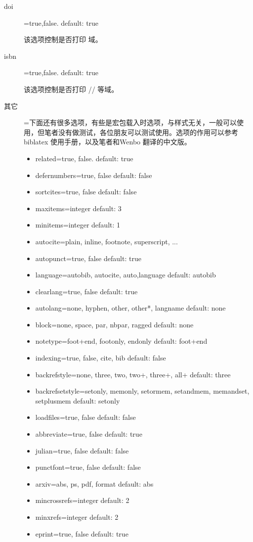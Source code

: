 \begin{description}
  \item[doi]=true,false. \hfill default: true

  该选项控制是否打印  域。

  \item[isbn]=true,false. \hfill default: true

  该选项控制是否打印 \slash {}\slash {} 等域。

  \item[其它]=下面还有很多选项，有些是宏包载入时选项，与样式无关，一般可以使用，但笔者没有做测试，各位朋友可以测试使用。选项的作用可以参考biblatex 使用手册，以及笔者和Wenbo 翻译的中文版。
      \begin{itemize}
          \item related=true, false. default: true
          \item defernumbers=true, false default: false
          \item sortcites=true, false default: false
          \item maxitems=integer default: 3
          \item minitems=integer default: 1
          \item autocite=plain, inline, footnote, superscript, ...
          \item autopunct=true, false default: true
          \item language=autobib, autocite, auto,language default: autobib
          \item clearlang=true, false default: true
          \item autolang=none, hyphen, other, other*, langname default: none
          \item block=none, space, par, nbpar, ragged default: none
          \item notetype=foot+end, footonly, endonly default: foot+end
          \item indexing=true, false, cite, bib default: false
          \item backrefstyle=none, three, two, two+, three+, all+ default: three
          \item backrefsetstyle=setonly, memonly, setormem, setandmem, memandset, setplusmem default: setonly
          \item loadfiles=true, false default: false
          \item abbreviate=true, false default: true
          \item julian=true, false default: false
          \item punctfont=true, false default: false
          \item arxiv=abs, ps, pdf, format default: abs
          \item mincrossrefs=integer default: 2
          \item minxrefs=integer default: 2
          \item eprint=true, false default: true
      \end{itemize}

\end{description}



